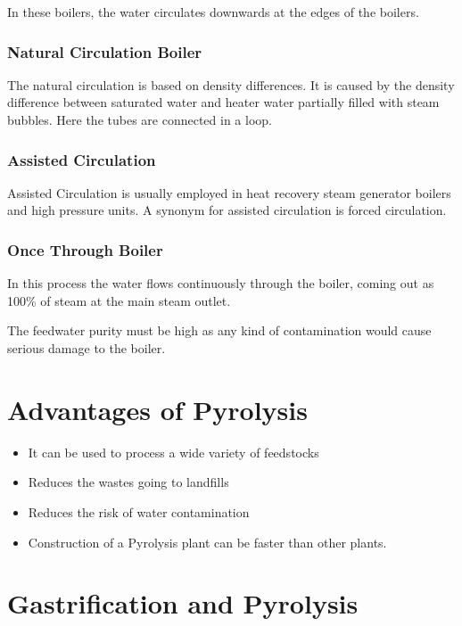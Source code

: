 \documentclass[12pt,a4paper]{article}
\begin{document}
In these boilers, the water circulates downwards at the edges of the boilers. 
\cite[p.~89]{steam-generation}


\subsubsection{Natural Circulation Boiler}

The natural circulation is based on density differences. It is caused by the density difference between saturated water and heater water partially filled with steam bubbles. Here the tubes are connected in a loop. 
\cite[p.~89]{steam-generation}

\subsubsection{Assisted Circulation}
Assisted Circulation is usually employed in heat recovery steam generator boilers and high pressure units. A synonym for assisted circulation is forced circulation.
\cite[p.~89]{steam-generation}

\subsubsection{Once Through Boiler}

In this process the water flows continuously through the boiler, coming out as 100\% of steam at the main steam outlet. 

The feedwater purity must be high as any kind of contamination would cause serious damage to the boiler. 

\cite[p.~89]{steam-generation}

\section{Advantages of Pyrolysis}

\begin{itemize}
\item It can be used to process a wide variety of feedstocks
\item Reduces the wastes going to landfills
\item Reduces the risk of water contamination
\item Construction of a Pyrolysis plant can be faster than other plants.
\end{itemize}


\section{Gastrification and Pyrolysis}
\end{document}

